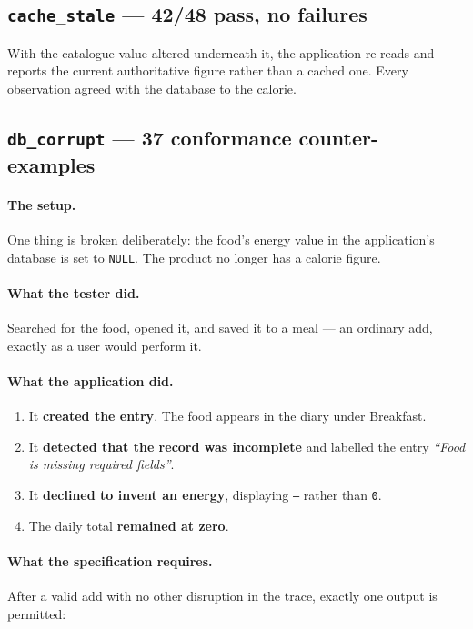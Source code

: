 \documentclass[11pt,a4paper]{article}
\newcommand{\gate}[1]{\texttt{\small #1}}
\begin{document}
\subsection{\gate{cache\_stale} --- 42/48 pass, no failures}
With the catalogue value altered underneath it, the application re-reads and
reports the current authoritative figure rather than a cached one. Every
observation agreed with the database to the calorie.

\subsection{\gate{db\_corrupt} --- 37 conformance counter-examples}
\label{sec:dbcorrupt}

\paragraph{The setup.}
One thing is broken deliberately: the food's energy value in the application's
database is set to \texttt{NULL}. The product no longer has a calorie figure.

\paragraph{What the tester did.}
Searched for the food, opened it, and saved it to a meal --- an ordinary add,
exactly as a user would perform it.

\paragraph{What the application did.}
\begin{enumerate}\setlength\itemsep{1pt}
  \item It \textbf{created the entry}. The food appears in the diary under
        Breakfast.
  \item It \textbf{detected that the record was incomplete} and labelled the
        entry \emph{``Food is missing required fields''}.
  \item It \textbf{declined to invent an energy}, displaying \texttt{---} rather
        than \texttt{0}.
  \item The daily total \textbf{remained at zero}.
\end{enumerate}

\paragraph{What the specification requires.}
After a valid add with no other disruption in the trace, exactly one output is
permitted:
\end{document}
